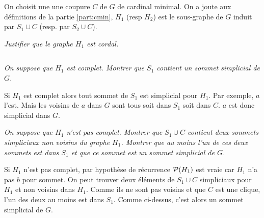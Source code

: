 On choisit une une coupure $C$ de $G$ de cardinal minimal. On a joute aux définitions de la partie \ref{part:cmin},  $H_1$ (resp $H_2$) est le sous-graphe de $G$ induit par $S_1\cup C$ (resp. par $S_2\cup C$).
\begin{Exercise}\it
Justifier que le graphe $H_1$ est cordal.
\end{Exercise}  
\begin{Answer}
\begin{lstlisting}
\end{lstlisting}
\end{Answer}
\begin{Exercise}\it
On suppose que $H_1$ est complet. Montrer que $S_1$ contient un sommet simplicial de $G$.
\end{Exercise}  
\begin{Answer}
Si $H_1$ est complet alors tout sommet de $S_1$ est simplicial pour $H_1$. Par exemple, $a$ l'est. Mais les voisins de $a$ dans $G$ sont tous soit dans $S_1$ soit dans $C$. $a$ est donc simplicial dans $G$.
\end{Answer}
\begin{Exercise}\it
On suppose que $H_1$ n'est pas complet. Montrer que $S_1\cup C$ contient deux sommets simpliciaux non voisins du graphe $H_1$. Montrer que au moins l'un de ces deux sommets est dans $S_1$ et que ce sommet est un sommet simplicial de $G$.
\end{Exercise}  
\begin{Answer}
Si $H_1$ n'est pas complet, par hypothèse de récurrence ${\cal P}(H_1)$ est vraie car $H_1$ n'a pas $b$ pour sommet. On peut trouver deux éléments de $S_1\cup C$ simpliciaux pour $H_1$ et non voisins dans $H_1$. Comme ils ne sont pas voisins et que $C$ est une clique, l'un des deux au moins est dans $S_1$. Comme ci-dessus, c'est alors un sommet simplicial de $G$.
\end{Answer}
